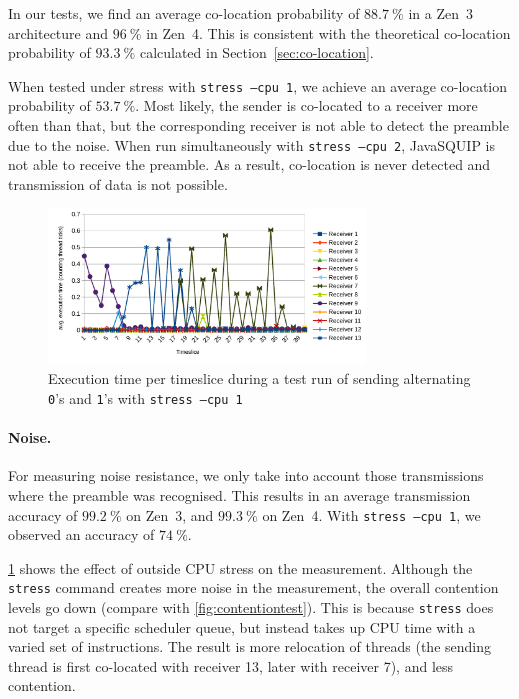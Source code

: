 \documentclass[11pt,
  titlepage=false,
  parskip=half,      %
]{scrreprt}
\begin{document}
In our tests, we find an average co-location probability of $88.7~\%$ in a Zen~3 architecture and $96~\%$ in Zen~4.
This is consistent with the theoretical co-location probability of $93.3~\%$ calculated in Section~\ref{sec:co-location}.

When tested under stress with \texttt{stress --cpu 1}, we achieve an average co-location probability of $53.7~\%$.
Most likely, the sender is co-located to a receiver more often than that,
but the corresponding receiver is not able to detect the preamble due to the noise.
When run simultaneously with \texttt{stress --cpu 2}, JavaSQUIP is not able to receive the preamble.
As a result, co-location is never detected and transmission of data is not possible.

\begin{figure}
    \centering
    \includegraphics[width=0.75\textwidth]{figures/contentiontest_stress}

    \caption{Execution time per timeslice during a test run of sending alternating \texttt{0}'s and \texttt{1}'s with \texttt{stress --cpu 1}}
    \label{fig:contentiontest_stress}
\end{figure}

\paragraph{Noise.}
For measuring noise resistance, we only take into account those transmissions where the preamble was recognised.
This results in an average transmission accuracy of $99.2~\%$ on Zen~3, and $99.3~\%$ on Zen~4.
With \texttt{stress --cpu 1}, we observed an accuracy of $74~\%$.

\ref{fig:contentiontest_stress} shows the effect of outside CPU stress on the measurement.
Although the \texttt{stress} command creates more noise in the measurement, the overall contention levels go down (compare with \ref{fig:contentiontest}).
This is because \texttt{stress} does not target a specific scheduler queue, but instead takes up CPU time with a varied set of instructions.
The result is more relocation of threads (the sending thread is first co-located with receiver 13, later with receiver 7), and less contention.
\end{document}
